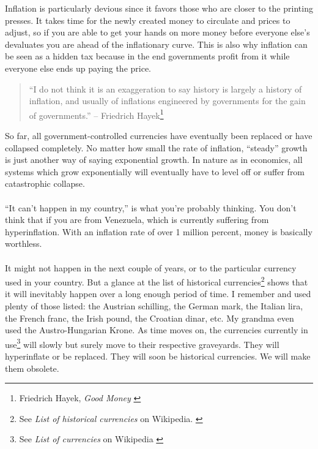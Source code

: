 Inflation is particularly devious since it favors those who are closer
to the printing presses. It takes time for the newly created money to
circulate and prices to adjust, so if you are able to get your hands on
more money before everyone else's devaluates you are ahead of the
inflationary curve. This is also why inflation can be seen as a hidden
tax because in the end governments profit from it while everyone else
ends up paying the price.

\begin{quotation}\begin{samepage}
\enquote{I do not think it is an exaggeration to say history is largely a
history of inflation, and usually of inflations engineered by
governments for the gain of governments.}
\flushright -- Friedrich Hayek\footnote{Friedrich Hayek, \textit{Good Money} \cite{hayek-good-money}}
\end{samepage}\end{quotation}

\newpage

So far, all government-controlled currencies have eventually been
replaced or have collapsed completely. No matter how small the rate of
inflation, \enquote{steady} growth is just another way of saying exponential
growth. In nature as in economics, all systems which grow exponentially
will eventually have to level off or suffer from catastrophic collapse.

\paragraph{}
\enquote{It can't happen in my country,} is what you're probably thinking. You don't
think that if you are from Venezuela, which is currently suffering from
hyperinflation. With an inflation rate of over 1 million percent, money is
basically worthless. \cite{wiki:venezuela}

\paragraph{}
It might not happen in the next couple of years, or to the particular currency
used in your country. But a glance at the list of historical
currencies\footnote{See \textit{List of historical currencies} on Wikipedia.
\cite{wiki:historical-currencies}} shows that it will inevitably happen over a
long enough period of time. I remember and used plenty of those listed: the
Austrian schilling, the German mark, the Italian lira, the French franc, the
Irish pound, the Croatian dinar, etc. My grandma even used the Austro-Hungarian
Krone. As time moves on, the currencies currently in use\footnote{See
\textit{List of currencies} on Wikipedia \cite{wiki:list-of-currencies}} will
slowly but surely move to their respective graveyards. They will hyperinflate or
be replaced. They will soon be historical currencies. We will make them
obsolete.

